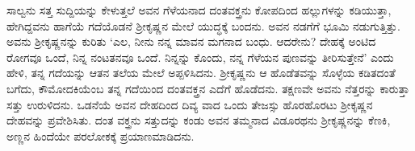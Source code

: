 ಸಾಲ್ವನು ಸತ್ತ ಸುದ್ದಿಯನ್ನು ಕೇಳುತ್ತಲೆ ಅವನ ಗೆಳೆಯನಾದ ದಂತವಕ್ತ್ರನು ಕೋಪದಿಂದ ಹಲ್ಲುಗಳನ್ನು ಕಡಿಯುತ್ತಾ, ಹೇಗಿದ್ದವನು ಹಾಗೆಯೆ ಗದೆಯೊಡನೆ ಶ್ರೀಕೃಷ್ಣನ ಮೇಲೆ ಯುದ್ಧಕ್ಕೆ ಬಂದನು. ಅವನ ನಡಗೆಗೆ ಭೂಮಿ ನಡುಗುತ್ತಿತ್ತು. ಅವನು ಶ್ರೀಕೃಷ್ಣನನ್ನು ಕುರಿತು ‘ಎಲ, ನೀನು ನನ್ನ ಮಾವನ ಮಗನಾದ ಬಂಧು. ಆದರೇನು? ದೇಹಕ್ಕೆ ಅಂಟಿದ ರೋಗವೂ ಒಂದೆ, ನಿನ್ನ ನಂಟತನವೂ ಒಂದೆ. ನಿನ್ನನ್ನು ಕೊಂದು, ನನ್ನ ಗೆಳೆಯನ ಪುಣವನ್ನು ತೀರಿಸುತ್ತೇನೆ’ ಎಂದು ಹೇಳಿ, ತನ್ನ ಗದೆಯನ್ನು ಆತನ ತಲೆಯ ಮೇಲೆ ಅಪ್ಪಳಿಸಿದನು. ಶ್ರೀಕೃಷ್ಣನು ಆ ಹೊಡೆತವನ್ನು ಸೊಳ್ಳೆಯ ಕಡಿತದಂತೆ ಬಗೆದು, ಕೌಮೋದಕಿಯೆಂಬ ತನ್ನ ಗದೆಯಿಂದ ದಂತವಕ್ತ್ರನ ಎದೆಗೆ ಹೊಡೆದನು. ತಕ್ಷಣವೇ ಅವನು ನೆತ್ತರನ್ನು ಕಾರುತ್ತಾ ಸತ್ತು ಉರುಳಿದನು. ಒಡನೆಯೆ ಅವನ ದೇಹದಿಂದ ದಿವ್ಯ ವಾದ ಒಂದು ತೇಜಸ್ಸು ಹೊರಹೊರಟು ಶ್ರೀಕೃಷ್ಣನ ದೇಹವನ್ನು ಪ್ರವೇಶಿಸಿತು. ದಂತ ವಕ್ತ್ರನು ಸತ್ತುದನ್ನು ಕಂಡು ಅವನ ತಮ್ಮನಾದ ವಿಡೂರಥನು ಶ್ರೀಕೃಷ್ಣನನ್ನು ಕೆಣಕಿ, ಅಣ್ಣನ ಹಿಂದೆಯೇ ಪರಲೋಕಕ್ಕೆ ಪ್ರಯಾಣಮಾಡಿದನು.

